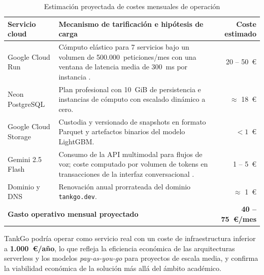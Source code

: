 \begin{table}[H]
  \centering
  \caption{Estimación proyectada de costes mensuales de operación}
  \label{tab:prod_cost}
  \small
  \begin{tabularx}{\textwidth}{lXr}
    \toprule
    \textbf{Servicio cloud}                                         & \textbf{Mecanismo de tarificación e hipótesis de carga}                                                                                                           & \textbf{Coste estimado} \\
    \midrule
    Google Cloud Run                                                & Cómputo elástico para 7 servicios bajo un volumen de 500.000~peticiones/mes con una ventana de latencia media de 300~ms por instancia \cite{gcp_run_pricing}.     & 20 -- 50~€              \\
    Neon PostgreSQL                                                 & Plan profesional con 10~GiB de persistencia e instancias de cómputo con escalado dinámico a cero.                                                                 & $\approx$ 18~€          \\
    Google Cloud Storage                                            & Custodia y versionado de snapshots en formato Parquet y artefactos binarios del modelo LightGBM.                                                                  & $< 1$~€                 \\
    Gemini 2.5 Flash                                                & Consumo de la API multimodal para flujos de voz; coste computado por volumen de tokens en transacciones de la interfaz conversacional \cite{gemini_pricing_2025}. & 1 -- 5~€                \\
    Dominio y DNS                                                   & Renovación anual prorrateada del dominio \texttt{tankgo.dev}.                                                                                                     & $\approx$ 1~€           \\
    \midrule
    \multicolumn{2}{l}{\textbf{Gasto operativo mensual proyectado}} & \textbf{40 -- 75~€/mes}                                                                                                                                                                     \\
    \bottomrule
  \end{tabularx}
\end{table}

TankGo podría operar como servicio real con un coste de infraestructura inferior a
\textbf{1.000~€/año}, lo que refleja la eficiencia económica de las arquitecturas serverless
y los modelos \textit{pay-as-you-go} para proyectos de escala media, y confirma la viabilidad
económica de la solución más allá del ámbito académico.

